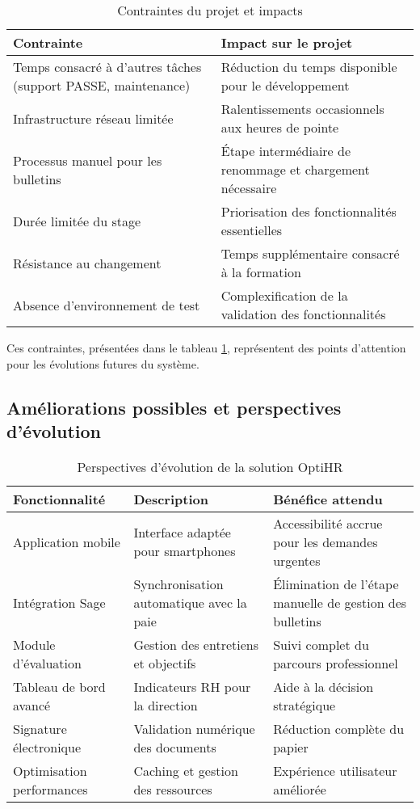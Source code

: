 \begin{table}[H]
\centering
\caption{Contraintes du projet et impacts}
\label{tab:contraintes}
\begin{tabular}{|p{5cm}|p{9cm}|}
\hline
\textbf{Contrainte} & \textbf{Impact sur le projet} \\
\hline
Temps consacré à d'autres tâches (support PASSE, maintenance) & Réduction du temps disponible pour le développement \\
\hline
Infrastructure réseau limitée & Ralentissements occasionnels aux heures de pointe \\
\hline
Processus manuel pour les bulletins & Étape intermédiaire de renommage et chargement nécessaire \\
\hline
Durée limitée du stage & Priorisation des fonctionnalités essentielles \\
\hline
Résistance au changement & Temps supplémentaire consacré à la formation \\
\hline
Absence d'environnement de test & Complexification de la validation des fonctionnalités \\
\hline
\end{tabular}
\end{table}

Ces contraintes, présentées dans le tableau \ref{tab:contraintes}, représentent des points d'attention pour les évolutions futures du système.

\subsection{Améliorations possibles et perspectives d'évolution}

\begin{table}[H]
\centering
\caption{Perspectives d'évolution de la solution OptiHR}
\label{tab:evolutions}
\begin{tabular}{|p{4cm}|p{5cm}|p{5cm}|}
\hline
\textbf{Fonctionnalité} & \textbf{Description} & \textbf{Bénéfice attendu} \\
\hline
Application mobile & Interface adaptée pour smartphones & Accessibilité accrue pour les demandes urgentes \\
\hline
Intégration Sage & Synchronisation automatique avec la paie & Élimination de l'étape manuelle de gestion des bulletins \\
\hline
Module d'évaluation & Gestion des entretiens et objectifs & Suivi complet du parcours professionnel \\
\hline
Tableau de bord avancé & Indicateurs RH pour la direction & Aide à la décision stratégique \\
\hline
Signature électronique & Validation numérique des documents & Réduction complète du papier \\
\hline
Optimisation performances & Caching et gestion des ressources & Expérience utilisateur améliorée \\
\hline
\end{tabular}
\end{table}

